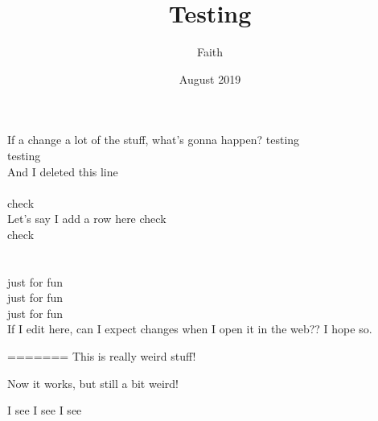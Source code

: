\documentclass{article}
\title{Testing}
\date{August 2019}
\author{Faith}
\begin{document}
\maketitle
If a change a lot of the stuff, what's gonna happen?
testing \\
testing\\
And I deleted this line
\\
\\
check\\


Let's say I add a row here
check\\
check\\
\\
\\
just for fun
\\
just for fun
\\
just for fun
\\

If I edit here, can I expect changes when I open it in the web?? I hope so.


=======
This is really weird stuff!


Now it works, but still a bit weird!

I see I see I see 
\end{document}
